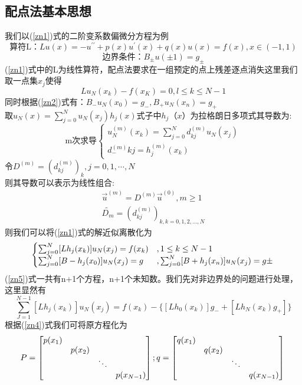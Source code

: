 \documentclass[12pt]{ctexart}
\numberwithin{equation}{section} %
\begin{document}
\subsection{配点法基本思想}
我们以(\ref{zn1})式的二阶变系数偏微分方程为例
\begin{equation}\label{zn1}
    \text{算符L：}Lu(x)=-u^{\prime\prime}+p(x)u^\prime(x)+q(x)u(x)=f(x),x\in(-1,1)
\end{equation}
\begin{equation}\label{zn2}
    \text{边界条件：}B_{\pm} u(\pm1)=g_{\pm}
\end{equation}
(\ref{zn1})式中的L为线性算符，配点法要求在一组预定的点上残差逐点消失这里我们取一点集${x_j}$使得
\begin{equation}\label{zn3}
    Lu_N(x_k)-f(x_K)=0,l\le k\le N-1
\end{equation}
同时根据(\ref{zn2})式有：$B_-u_N(x_0)=g_-,B_+u_N(x_n)=g_+$\\
取$u_N(x)=\sum^N_{j=0}u_N(x_j)h_j(x)$式子中$h_j（x）$为拉格朗日多项式其导数为:
$$\text{m次求导}
\begin{cases}
    u_N^{(m)}(x_k)=\sum^N_{j=0}d^{(m)}_{kj}u_N(x_j)\\
    d^{(m)}_-{kj}=h^{(m)}_j(x_k)
\end{cases}$$
令$D^{(m)}=(d^{(m)}_{kj})_k,j=0,1,\cdots,N$\\
则其导数可以表示为线性组合:
\begin{equation}\label{zn4}
\begin{split}
\Vec{u}^{(m)}=D^{(m)}\Vec{u}^{(0)},m\geq 1\\
\widetilde{D_m}=(d^{(m)}_{kj})_{k,k=0,1,2,...,N}
\end{split}
\end{equation}
则我们可以将(\ref{zn1})式的解近似离散化为
\begin{equation}\label{zn5}
    \begin{cases}
    \sum^N_{j=0}[Lh_j(x_k)]u_N(x_j)=f(x_k)&,1\leq k\leq N-1\\
    \sum^N_{j=0}[B-h_j(x_0)]u_N(x_j)=g&,\sum^N_{j=0}[B+h_j(x_n)]u_N(x_j)=g\pm
\end{cases}\\
\end{equation}
(\ref{zn5})式一共有n+1个方程，n+1个未知数。我们先对非边界处的问题进行处理，这里显然有
\begin{equation}\label{zn6}
    \sum^{N-1}_{J=1}[Lh_j(x_k)]u_N(x_j)=f(x_k)-\{ [Lh_0(x_k)]g_-+[Lh_N(x_k)g_+]\}
\end{equation}
根据(\ref{zn4})式我们可将原方程化为
\begin{equation}\label{zn7}
        P=
\begin{bmatrix}
    p(x_1)& & &  \\
     &p(x_2)& & \\
     & &\ddots& \\
     & & &p(x_{N-1})
\end{bmatrix};q=
\begin{bmatrix}
    q(x_1)& & &  \\
     &q(x_2)& & \\
     & &\ddots& \\
     & & &q(x_{N-1})
\end{bmatrix}\\
\end{equation}
\end{document}

